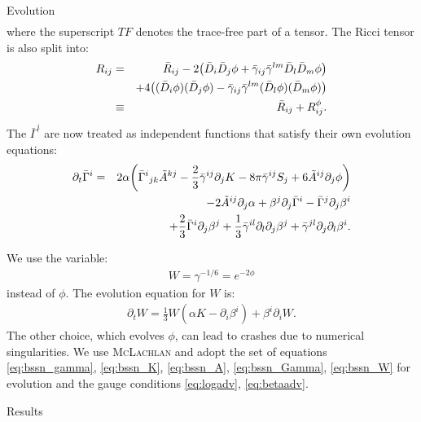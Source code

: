 \documentclass[noamssymb]{beamer}
\newlength{\colwidth}
\begin{document}
\begin{frame}[t]
\begin{columns}[t]
\begin{column}{\colwidth}
\begin{block}{Evolution}
\begin{eqnarray}
  	\end{eqnarray}
  	where the superscript $TF$ denotes the trace-free part of a tensor. The Ricci tensor is also split into:
  	\begin{eqnarray}
  		R_{ij}
  		&=& \bar{R}_{ij} - 2 \qty(\bar{D}_i\bar{D}_j \phi + \bar{\gamma}_{ij}\bar{\gamma}^{lm}\bar{D}_l \bar{D}_m \phi)\nonumber\\&&+4\qty((\bar{D}_i \phi)(\bar{D}_j \phi) - \bar{\gamma}_{ij}\bar{\gamma}^{lm}(\bar{D}_l \phi)(\bar{D}_m \phi) )\nonumber\\
  		&\equiv& \bar{R}_{ij} + R^\phi_{ij}.
  	\end{eqnarray}
  	The $\bar{\Gamma}^{i}$ are now treated as independent functions that satisfy their own evolution equations:
  	\begin{eqnarray}
  		\label{eq:bssn_Gamma}
  		\partial_t \bar{\Gamma}^i &=& 2\alpha \qty(\bar{\Gamma}^i{}_{jk} \tilde{A}^{kj} - \frac{2}{3}\bar{\gamma}^{ij}\partial_j K - 8\pi \bar{\gamma}^{ij} S_j + 6\tilde{A}^{ij}\partial_j \phi) \nonumber\\&& -2\tilde{A}^{ij}\partial_j \alpha + \beta^j \partial_j \bar{\Gamma}^i - \bar{\Gamma}^j \partial_j \beta^i \nonumber\\&&+ \frac{2}{3}\bar{\Gamma}^i \partial_j \beta^j + \frac{1}{3}\bar{\gamma}^{il}\partial_l \partial_j \beta^j + \bar{\gamma}^{jl}\partial_j\partial_l\beta^i.
  	\end{eqnarray}

  	We use the variable:
  	\begin{eqnarray}
  		W = \gamma^{-1/6} = e^{-2\phi}
  	\end{eqnarray}
  	instead of $\phi$. The evolution equation for $W$ is:
  	\begin{eqnarray}
  		\label{eq:bssn_W}
  		\partial_t W = \frac{1}{3}W(\alpha K - \partial_i \beta^i)+\beta^i \partial_i W.
  	\end{eqnarray}
  	The other choice, which evolves $\phi$, can lead to crashes due to numerical singularities.
  	We use \textsc{McLachlan} \cite{Brown:2008sb, Kranc:web, McLachlan:web} and adopt the set of equations \eqref{eq:bssn_gamma}, \eqref{eq:bssn_K}, \eqref{eq:bssn_A}, \eqref{eq:bssn_Gamma}, \eqref{eq:bssn_W} for evolution and the gauge conditions \eqref{eq:logadv}, \eqref{eq:betaadv}.



  \end{block}

  \begin{block}{Results}
  	

\end{block}
\end{column}
\end{columns}
\end{frame}
\end{document}

